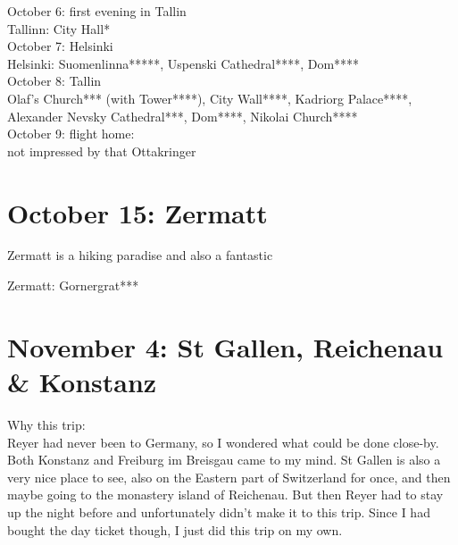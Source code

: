October 6: first evening in Tallin\\
Tallinn: City Hall*\\

October 7: Helsinki\\
Helsinki: Suomenlinna*****, Uspenski Cathedral****, Dom****\\

October 8: Tallin\\
Olaf's Church*** (with Tower****), City Wall****, Kadriorg Palace****, Alexander Nevsky Cathedral***, Dom****, Nikolai Church****\\

October 9: flight home:\\
not impressed by that Ottakringer

\section{October 15: Zermatt}
\label{Zermatt2017}

Zermatt is a hiking paradise and also a fantastic 

Zermatt: Gornergrat***

\section{November 4: St Gallen, Reichenau \& Konstanz}
\label{StGallen2017}

Why this trip:\\
Reyer had never been to Germany, so I wondered what could be done close-by. Both Konstanz and Freiburg im Breisgau came to my mind. St Gallen is also a very nice place to see, also on the Eastern part of Switzerland for once, and then maybe going to the monastery island of Reichenau. But then Reyer had to stay up the night before and unfortunately didn't make it to this trip. Since I had bought the day ticket though, I just did this trip on my own.\\

